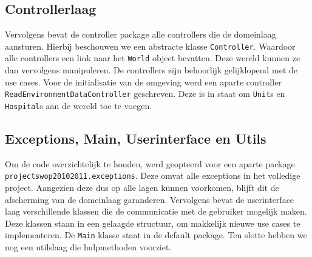 \subsection{Controllerlaag}
Vervolgens bevat de controller package alle controllers die de domeinlaag aansturen. Hierbij beschouwen we een abstracte klasse \texttt{Controller}. Waardoor alle controllers een link naar het \texttt{World} object bevatten. Deze wereld kunnen ze dan vervolgens manipuleren. De controllers zijn behoorlijk gelijklopend met de use cases. Voor de initialisatie van de omgeving werd een aparte controller \texttt{ReadEnvironmentDataController} geschreven. Deze is in staat om \texttt{Unit}s en \texttt{Hospital}s aan de wereld toe te voegen.

\subsection{Exceptions, Main, Userinterface en Utils}
Om de code overzichtelijk te houden, werd geopteerd voor een aparte package \texttt{projectswop20102011.\-exceptions}. Deze omvat alle exceptions in het volledige project. 
Aangezien deze dus op alle lagen kunnen voorkomen, blijft dit de afscherming van de domeinlaag garanderen. Vervolgens bevat de userinterface laag verschillende klassen die de communicatie met de gebruiker mogelijk maken. Deze klassen staan in een gelaagde structuur, om makkelijk nieuwe use cases te implementeren. De \texttt{Main} klasse staat in de default package. Ten slotte hebben we nog een utilslaag die hulpmethoden voorziet.
